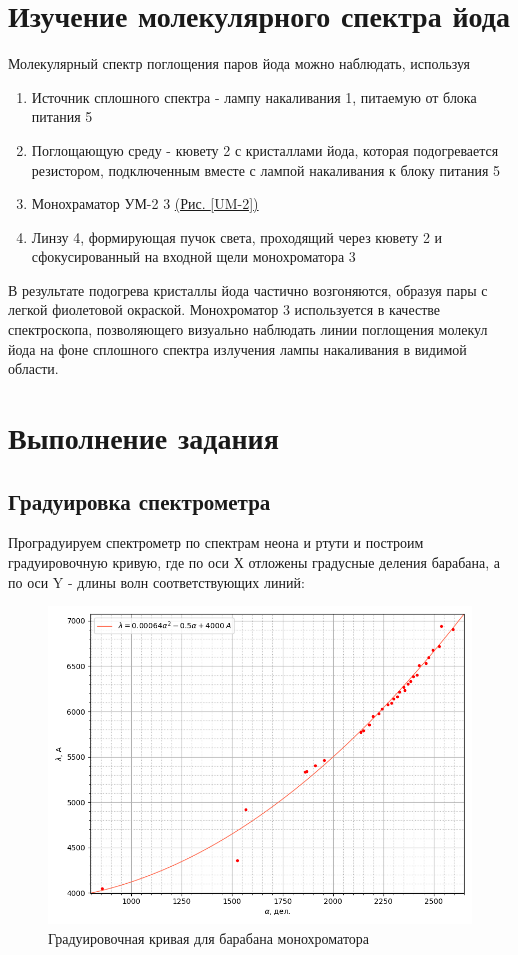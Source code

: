\documentclass{article}
\begin{document}
\section{Изучение молекулярного спектра йода}

Молекулярный спектр поглощения паров йода можно наблюдать, используя
\begin{enumerate}
    \item Источник сплошного спектра - лампу накаливания 1, питаемую от блока питания 5
    \item Поглощающую среду - кювету 2 с кристаллами йода, которая подогревается резистором, подключенным вместе с лампой накаливания к блоку питания 5 
    \item Монохраматор УМ-2 3  \hyperref[UM-2]{(Рис. \ref*{UM-2})}
    \item Линзу 4, формирующая пучок света, проходящий через кювету 2 и сфокусированный на входной щели монохроматора 3
\end{enumerate}

В результате подогрева кристаллы йода частично возгоняются, образуя пары с легкой фиолетовой окраской. Монохроматор 3 используется в качестве спектроскопа, позволяющего визуально наблюдать линии поглощения молекул йода на фоне сплошного спектра излучения лампы накаливания в видимой области. 
\newpage
\section{Выполнение задания}
\subsection{Градуировка спектрометра}
Проградуируем спектрометр по спектрам неона и ртути и построим градуировочную кривую, где по оси Х отложены градусные деления барабана, а по оси Y - длины волн соответствующих линий:
\begin{figure}[h!]
    \centering
    \includegraphics[scale = 0.75]{Figure_1 (1).png}
    \caption{Градуировочная кривая для барабана монохроматора}
    \label{fig:1}
\end{figure}
\end{document}
